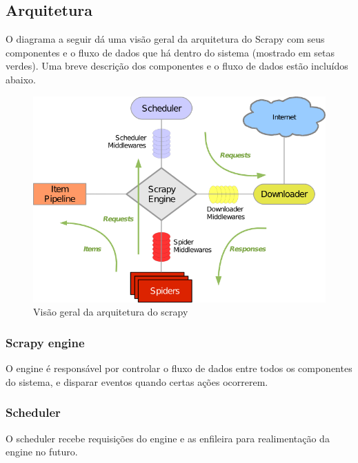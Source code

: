 \subsection{Arquitetura}

O diagrama a seguir dá uma visão geral da arquitetura do Scrapy com seus componentes e o fluxo de dados que há dentro do sistema (mostrado em setas verdes). Uma breve descrição dos componentes e o fluxo de dados estão incluídos abaixo.

\begin{figure} [ht]
	\centering
	\includegraphics[scale=1]{scrapy_architecture.png}
	\caption{Visão geral da arquitetura do scrapy \cite{scrapy_arch}}
	\label{scrapy_architecture}
\end{figure}

\subsubsection{Scrapy engine}

O engine é responsável por controlar o fluxo de dados entre todos os componentes do sistema, e disparar eventos quando certas ações ocorrerem.

\subsubsection{Scheduler}

O scheduler recebe requisições do engine e as enfileira para realimentação da engine no futuro.

